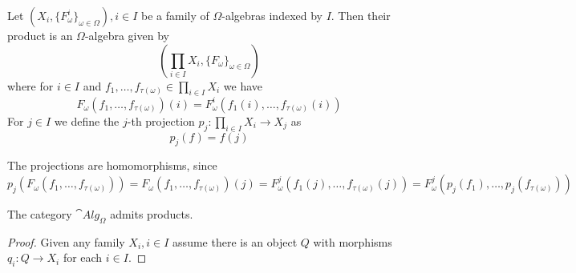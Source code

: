 \begin{definition}
    Let $(X_i, \{F^i_{\omega}\}_{\omega\in\Omega}), i \in I$ be a family of
    $\Omega$-algebras indexed by $I$. Then their product is an $\Omega$-algebra given by
    \[
    \left(\prod_{i\in I} X_i, \{F_\omega\}_{\omega\in\Omega}\right)
    \]
    where for $i\in I$ and $f_1,\dots,f_{\tau(\omega)} \in \prod_{i\in I} X_i$ we have
    \[
        F_\omega(f_1,\dots,f_{\tau(\omega)})(i) = F^{i}_\omega(f_1(i),\dots,f_{\tau(\omega)}(i))
    \]
    For $j\in I$ we define the $j$-th projection $p_j : \prod_{i\in I} X_i \to X_j$ as
    \[
        p_j(f) = f(j)
    \]
\end{definition} 
\begin{remark}
    The projections are homomorphisms, since
    \[
        p_j(F_\omega(f_1,\dots,f_{\tau(\omega)})) = F_\omega(f_1,\dots,f_{\tau(\omega)})(j) =
        F^j_\omega (f_1(j),\dots,f_{\tau(\omega)}(j)) = F^j_\omega(p_j(f_1),\dots,p_j(f_{\tau(\omega)}))   
    \]
\end{remark}
\begin{proposition}
    The category $\cat{Alg}_\Omega$ admits products. 
\end{proposition}
\begin{proof}[Proof]
    Given any family $X_i,i\in I$ assume there is an object $Q$ with morphisms
    $q_i : Q \to X_i$ for each $i\in I$. 
\end{proof}